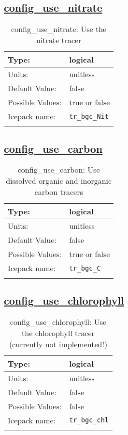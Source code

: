 \subsection[config\_use\_nitrate]{\hyperref[sec:nm_tab_biogeochemistry]{config\_use\_nitrate}}
\label{subsec:nm_sec_config_use_nitrate}
\begin{center}
\begin{longtable}{| p{2.0in} || p{4.0in} |}
    \hline
    Type: & logical \\
    \hline
    Units: & \si{unitless} \\
    \hline
    Default Value: & false \\
    \hline
    Possible Values: & true or false \\
    \hline
    \hline
    Icepack name: & \verb+tr_bgc_Nit+ \\
    \caption{config\_use\_nitrate: Use the nitrate tracer}
\end{longtable}
\end{center}
\subsection[config\_use\_carbon]{\hyperref[sec:nm_tab_biogeochemistry]{config\_use\_carbon}}
\label{subsec:nm_sec_config_use_carbon}
\begin{center}
\begin{longtable}{| p{2.0in} || p{4.0in} |}
    \hline
    Type: & logical \\
    \hline
    Units: & \si{unitless} \\
    \hline
    Default Value: & false \\
    \hline
    Possible Values: & true or false \\
    \hline
    \hline
    Icepack name: & \verb+tr_bgc_C+ \\
    \caption{config\_use\_carbon: Use dissolved organic and inorganic carbon tracers}
\end{longtable}
\end{center}
\subsection[config\_use\_chlorophyll]{\hyperref[sec:nm_tab_biogeochemistry]{config\_use\_chlorophyll}}
\label{subsec:nm_sec_config_use_chlorophyll}
\begin{center}
\begin{longtable}{| p{2.0in} || p{4.0in} |}
    \hline
    Type: & logical \\
    \hline
    Units: & \si{unitless} \\
    \hline
    Default Value: & false \\
    \hline
    Possible Values: & false \\
    \hline
    \hline
    Icepack name: & \verb+tr_bgc_chl+ \\
    \caption{config\_use\_chlorophyll: Use the chlorophyll tracer (currently not implemented!)}
\end{longtable}
\end{center}
